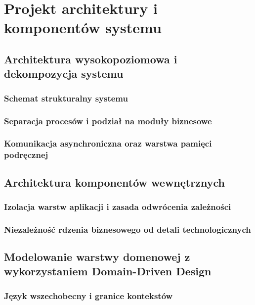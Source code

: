 \chapter{Projekt architektury i komponentów systemu}

\section{Architektura wysokopoziomowa i dekompozycja systemu}
\sectionanchor

\subsection{Schemat strukturalny systemu}
\sectionanchor

\subsection{Separacja procesów i podział na moduły biznesowe}
\sectionanchor

\subsection{Komunikacja asynchroniczna oraz warstwa pamięci podręcznej}
\sectionanchor

\section{Architektura komponentów wewnętrznych}
\sectionanchor

\subsection{Izolacja warstw aplikacji i zasada odwrócenia zależności}
\sectionanchor

\subsection{Niezależność rdzenia biznesowego od detali technologicznych}
\sectionanchor

\section{Modelowanie warstwy domenowej z wykorzystaniem Domain-Driven Design}
\sectionanchor

\subsection{Język wszechobecny i granice kontekstów}
\sectionanchor

